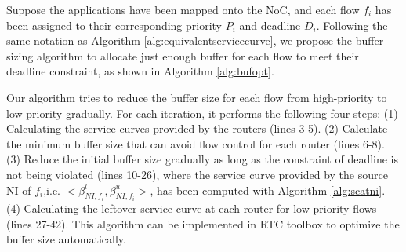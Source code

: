 \documentclass[preprint]{elsarticle}
\begin{document}
Suppose the applications have been mapped onto the NoC, and each flow $f_i$ has been assigned to their corresponding priority $P_i$ and deadline $D_i$. Following the same notation as Algorithm \ref{alg:equivalentservicecurve}, we propose the buffer sizing algorithm to allocate just enough buffer for each flow to meet their deadline constraint, as shown in Algorithm \ref{alg:bufopt}.

Our algorithm tries to reduce the buffer size for each flow from high-priority to low-priority gradually. For each iteration, it performs the following four steps: (1) Calculating the service curves provided by the routers (lines 3-5). (2) Calculate the minimum buffer size that can avoid flow control for each router (lines 6-8). (3) Reduce the initial buffer size gradually as long as the constraint of deadline is not being violated (lines 10-26), where the service curve provided by the source NI of $f_i$,i.e. $<\beta_{NI,f_i}^l,\beta_{NI,f_i}^u>$, has been computed with Algorithm \ref{alg:scatni}. (4) Calculating the leftover service curve at each router for low-priority flows (lines 27-42). This algorithm can be implemented in RTC toolbox \cite{rtc} to optimize the buffer size automatically.
\end{document}
